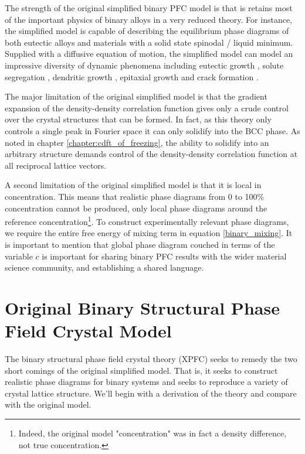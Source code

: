 The strength of the original simplified binary PFC model is that is retains
most of the important physics of binary alloys in a very reduced theory. For
instance, the simplified model is capable of describing the equilibrium phase
diagrams of both eutectic alloys and materials with a solid state spinodal /
liquid minimum.  Supplied with a diffusive equation of motion, the simplified
model can model an impressive diversity of dynamic phenomena including eutectic
growth \cite{ELDER07}, solute segregation \cite{STOLLE14}, dendritic growth
\cite{ELDER07}, epitaxial growth \cite{ELDER10_NANOISLAND, LU16} and crack
formation \cite{HU17}.

The major limitation of the original simplified model is that the gradient
expansion of the density-density correlation function gives only a crude
control over the crystal structures that can be formed. In fact, as this theory only
controls a single peak in Fourier space it can only solidify into the BCC
phase. As noted in chapter \ref{chapter:cdft_of_freezing}, the ability to
solidify into an arbitrary structure demands control of the
density-density correlation function at all reciprocal lattice vectors.

A second limitation of the original simplified model is that it is local in
concentration. This means that realistic phase diagrams from 0 to 100\%
concentration cannot be produced, only local phase diagrams around the
reference concentration\footnote{Indeed, the original model "concentration" was
in fact a density difference, not  true concentration.}.  To construct
experimentally relevant phase diagrams, we require the entire free energy of
mixing term in equation \ref{binary_mixing}. It is important to mention
that global phase diagram couched in terms of the variable $c$ is important for
sharing binary PFC results with the wider material science community, and
establishing a shared language.

\section{Original Binary Structural Phase Field Crystal  Model} %

The binary structural phase field crystal theory (XPFC) seeks to remedy the two
short comings of the original simplified model. That is, it seeks to construct
realistic phase diagrams for binary systems and seeks to reproduce a variety of
crystal lattice structure. We'll begin with a derivation of the theory and
compare with the original model.

